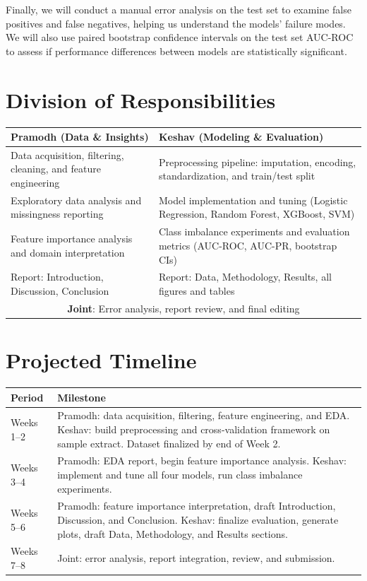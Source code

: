 \documentclass{article}
\begin{document}
Finally, we will conduct a manual error analysis on the test set to examine false positives and false negatives, helping us understand the models' failure modes. We will also use paired bootstrap confidence intervals on the test set AUC-ROC to assess if performance differences between models are statistically significant.

\section{Division of Responsibilities}

\begin{table}[h]
\centering
\begin{tabular}{p{} p{}}
\toprule
\textbf{Pramodh (Data \& Insights)} & \textbf{Keshav (Modeling \& Evaluation)} \\
\midrule
Data acquisition, filtering, cleaning, and feature engineering & Preprocessing pipeline: imputation, encoding, standardization, and train/test split \\
Exploratory data analysis and missingness reporting & Model implementation and tuning (Logistic Regression, Random Forest, XGBoost, SVM) \\
Feature importance analysis and domain interpretation & Class imbalance experiments and evaluation metrics (AUC-ROC, AUC-PR, bootstrap CIs) \\
Report: Introduction, Discussion, Conclusion & Report: Data, Methodology, Results, all figures and tables \\
\midrule
\multicolumn{2}{c}{\textbf{Joint}: Error analysis, report review, and final editing} \\
\bottomrule
\end{tabular}
\end{table}

\section{Projected Timeline}

\begin{table}[h]
\centering
\begin{tabular}{l p{}}
\toprule
\textbf{Period} & \textbf{Milestone} \\
\midrule
Weeks 1--2 & Pramodh: data acquisition, filtering, feature engineering, and EDA. Keshav: build preprocessing and cross-validation framework on sample extract. Dataset finalized by end of Week 2. \\
Weeks 3--4 & Pramodh: EDA report, begin feature importance analysis. Keshav: implement and tune all four models, run class imbalance experiments. \\
Weeks 5--6 & Pramodh: feature importance interpretation, draft Introduction, Discussion, and Conclusion. Keshav: finalize evaluation, generate plots, draft Data, Methodology, and Results sections. \\
Weeks 7--8 & Joint: error analysis, report integration, review, and submission. \\
\bottomrule
\end{tabular}
\end{table}
\end{document}

